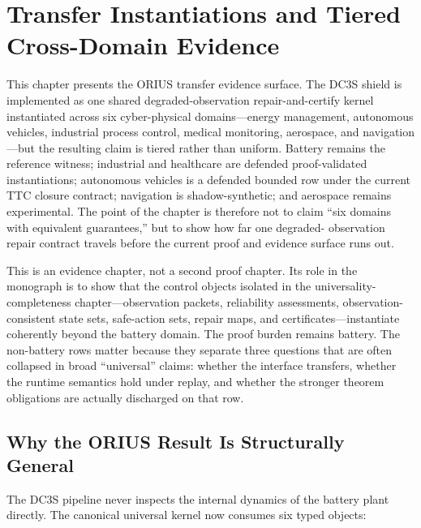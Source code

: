 
\chapter{Transfer Instantiations and Tiered Cross-Domain Evidence}
\label{ch:battery-to-orius}

This chapter presents the ORIUS transfer evidence surface.  The DC3S shield is
implemented as one shared degraded-observation repair-and-certify kernel
instantiated across six cyber-physical domains---energy management,
autonomous vehicles, industrial process control, medical monitoring,
aerospace, and navigation---but the resulting claim is tiered rather than
uniform.  Battery remains the reference witness; industrial and healthcare are
defended proof-validated instantiations; autonomous vehicles is a defended
bounded row under the current TTC closure contract; navigation is
shadow-synthetic; and aerospace remains
experimental.  The point of the chapter is therefore not to claim ``six
domains with equivalent guarantees,'' but to show how far one degraded-
observation repair contract travels before the current proof and evidence
surface runs out.

This is an evidence chapter, not a second proof chapter.  Its role in the
monograph is to show that the control objects isolated in the
universality-completeness chapter---observation packets, reliability
assessments, observation-consistent state sets, safe-action sets, repair
maps, and certificates---instantiate coherently beyond the battery domain.
The proof burden remains battery.  The non-battery rows matter because they
separate three questions that are often collapsed in broad ``universal''
claims: whether the interface transfers, whether the runtime semantics hold
under replay, and whether the stronger theorem obligations are actually
discharged on that row.

\section{Why the ORIUS Result Is Structurally General}

The DC3S pipeline never inspects the internal dynamics of the battery
plant directly.  The canonical universal kernel now consumes six typed
objects:

